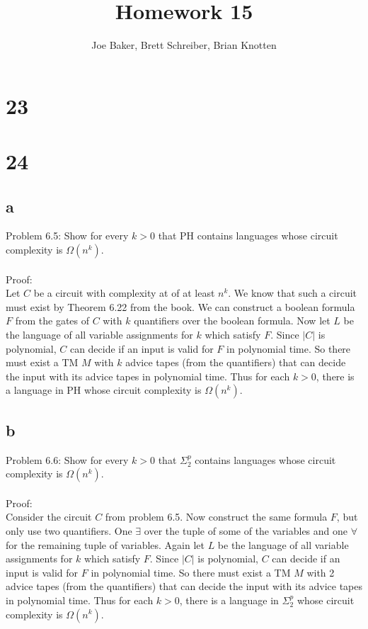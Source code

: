 \documentclass[letterpaper,notitlepage,twoside]{article}
\begin{document}
\title{Homework 15}
\author{Joe Baker, Brett Schreiber, Brian Knotten}
\maketitle

\section*{23}

\section*{24}

\subsection*{a}
Problem 6.5: Show for every $k > 0$ that PH contains languages whose circuit complexity is $\Omega\left(n^k\right)$.
\\\\
Proof:
\\
Let $C$ be a circuit with complexity at of at least $n^k$. We know that such a circuit must exist by Theorem 6.22 from the book. We can construct a boolean formula $F$ from the gates of $C$ with $k$ quantifiers over the boolean formula. Now let $L$ be the language of all variable assignments for $k$ which satisfy $F$. Since $\left| C \right|$ is polynomial, $C$ can decide if an input is valid for $F$ in polynomial time. So there must exist a TM $M$ with $k$ advice tapes (from the quantifiers) that can decide the input with its advice tapes in polynomial time. Thus for each $k > 0$, there is a language in PH whose circuit complexity is $\Omega\left(n^k\right)$.

\subsection*{b}
Problem 6.6: Show for every $k > 0$ that $\Sigma_2^p$ contains languages whose circuit complexity is $\Omega\left(n^k\right)$.
\\\\
Proof:
\\
Consider the circuit $C$ from problem 6.5. Now construct the same formula $F$, but only use two quantifiers. One $\exists$ over the tuple of some of the variables and one $\forall$ for the remaining tuple of variables. Again let $L$ be the language of all variable assignments for $k$ which satisfy $F$. Since $\left| C \right|$ is polynomial, $C$ can decide if an input is valid for $F$ in polynomial time. So there must exist a TM $M$ with 2 advice tapes (from the quantifiers) that can decide the input with its advice tapes in polynomial time. Thus for each $k > 0$, there is a language in $\Sigma_2^p$ whose circuit complexity is $\Omega\left(n^k\right)$.
\end{document}
